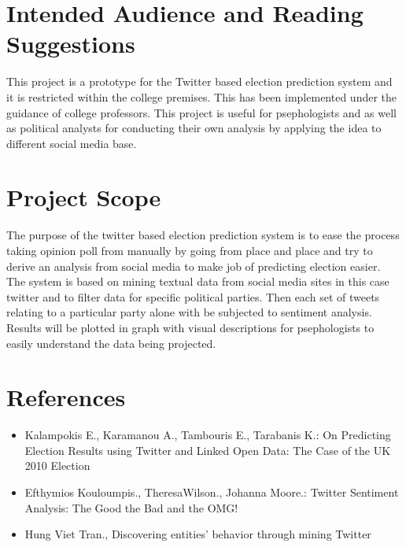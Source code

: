 \documentclass{scrreprt}
\begin{document}

\section{Intended Audience and Reading Suggestions}
This project is a prototype for the Twitter based election prediction system and it is restricted within the college premises. This has been implemented under the guidance of college professors. This project is useful for psephologists and as well as political analysts for conducting their own analysis by applying the idea to different social media base.

\section{Project Scope}
The purpose of the twitter based election prediction system is to ease the process taking opinion poll from manually by going from place and place and try to derive an 
analysis from social media to make job of predicting election easier. The system is based on mining textual data from social media sites in this case twitter and to filter data
for specific political parties. Then each set of tweets relating to a particular party alone with be subjected to sentiment analysis. Results will be plotted in graph with visual descriptions 
for psephologists to easily understand the data being projected.

\section{References}
\begin{itemize}
	\item Kalampokis E., Karamanou A., Tambouris E., Tarabanis K.: On Predicting Election Results using Twitter and Linked Open Data: The Case of the UK 2010 Election 
	\item Efthymios Kouloumpis., TheresaWilson., Johanna Moore.: Twitter Sentiment Analysis: The Good the Bad and the OMG!
	\item Hung Viet Tran., Discovering entities' behavior through mining Twitter
\end{itemize}
\end{document}
